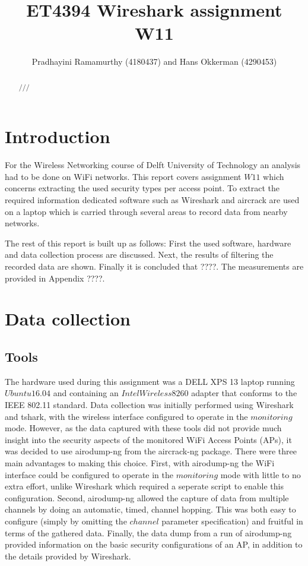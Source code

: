 \documentclass[letterpaper, 10 pt, conference]{ieeeconf}  %
\title{\LARGE \bf
ET4394 Wireshark assignment W11
}
\author{Pradhayini Ramamurthy (4180437) and Hans Okkerman (4290453)%
}
\begin{document}
\maketitle
\thispagestyle{empty}
\pagestyle{empty}


\begin{abstract}

///

\end{abstract}


\section{Introduction}
For the Wireless Networking course of Delft University of Technology an analysis had to be done on WiFi networks. This report covers assignment $W11$ which concerns extracting the used security types per access point. To extract the required information dedicated software such as Wireshark and aircrack are used on a laptop which is carried through several areas to record data from nearby networks. 

The rest of this report is built up as follows: First the used software, hardware and data collection process are discussed. Next, the results of filtering the recorded data are shown. Finally it is concluded that ????. The measurements are provided in Appendix ????.







\section{Data collection}
\subsection{Tools}
The hardware used during this assignment was a DELL XPS 13 laptop running $Ubuntu 16.04$ and containing an $Intel Wireless 8260$ adapter that conforms to the IEEE 802.11 standard. Data collection was initially performed using Wireshark and tshark, with the wireless interface configured to operate in the $monitoring$ mode. However, as the data captured with these tools did not provide much insight into the security aspects of the monitored WiFi Access Points (APs), it was decided to use airodump-ng from the aircrack-ng package. There were three main advantages to making this choice. First, with airodump-ng the WiFi interface could be configured to operate in the $monitoring$ mode with little to no extra effort, unlike Wireshark which required a seperate script to enable this configuration. Second, airodump-ng allowed the capture of data from multiple channels by doing an automatic, timed, channel hopping. This was both easy to configure (simply by omitting the $channel$ parameter specification) and fruitful in terms of the gathered data. Finally, the data dump from a run of airodump-ng provided information on the basic security configurations of an AP, in addition to the details provided by Wireshark. 
\end{document}
